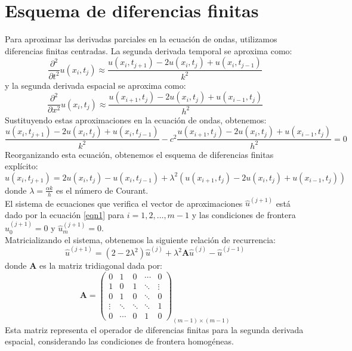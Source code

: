 \documentclass{replab}
\begin{document}
\section*{Esquema de diferencias finitas}
Para aproximar las derivadas parciales en la ecuación de ondas, utilizamos diferencias finitas centradas. La segunda derivada temporal se aproxima como:
\begin{equation*}
	\frac{\partial^2}{\partial t^2}u(x_i,t_j) \approx \frac{u(x_i,t_{j+1}) - 2u(x_i,t_j) + u(x_i,t_{j-1})}{k^2}
\end{equation*}
y la segunda derivada espacial se aproxima como:
\begin{equation*}
	\frac{\partial^2}{\partial x^2}u(x_i,t_j) \approx \frac{u(x_{i+1},t_j) - 2u(x_i,t_j) + u(x_{i-1},t_j)}{h^2}
\end{equation*}
Sustituyendo estas aproximaciones en la ecuación de ondas, obtenemos:
\begin{equation*}
	\frac{u(x_i,t_{j+1}) - 2u(x_i,t_j) + u(x_i,t_{j-1})}{k^2} - c^2 \frac{u(x_{i+1},t_j) - 2u(x_i,t_j) + u(x_{i-1},t_j)}{h^2} = 0
\end{equation*}
Reorganizando esta ecuación, obtenemos el esquema de diferencias finitas explícito:
\begin{equation}
	u(x_i,t_{j+1}) = 2u(x_i,t_j) - u(x_i,t_{j-1}) + \lambda^2 \left( u(x_{i+1},t_j) - 2u(x_i,t_j) + u(x_{i-1},t_j) \right)
	\label{eqn1}
\end{equation}
donde $\lambda = \frac{\alpha k}{h}$ es el número de Courant.\\

El sistema de ecuaciones que verifica el vector de aproximaciones $\hat{u}^{(j+1)}$ está dado por la ecuación \ref{eqn1} para $i=1, 2, \ldots, m-1$ y las condiciones de frontera $\hat{u}^{(j+1)}_0 = 0$ y $\hat{u}^{(j+1)}_m = 0$.\\

Matricializando el sistema, obtenemos la siguiente relación de recurrencia:
\begin{equation*}
	\hat{u}^{(j+1)} = (2 - 2\lambda^2) \hat{u}^{(j)} + \lambda^2 \mathbf{A} \hat{u}^{(j)} - \hat{u}^{(j-1)}
\end{equation*}
donde $\mathbf{A}$ es la matriz tridiagonal dada por:
\begin{equation*}
\mathbf{A} = 
\begin{pmatrix}
0 & 1 & 0 & \cdots & 0 \\
1 & 0 & 1 & \ddots & \vdots \\
0 & 1 & 0 & \ddots & 0 \\
\vdots & \ddots & \ddots & \ddots & 1 \\
0 & \cdots & 0 & 1 & 0
\end{pmatrix}_{(m-1)\times(m-1)}
\end{equation*}
Esta matriz representa el operador de diferencias finitas para la segunda derivada espacial, considerando las condiciones de frontera homogéneas.
\end{document}
